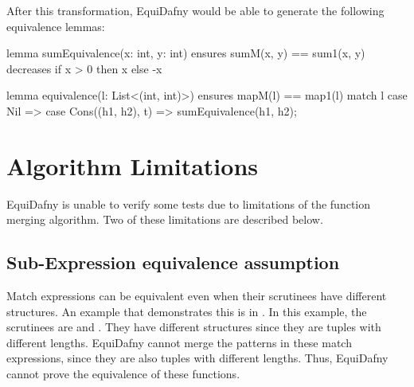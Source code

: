%
After this transformation, EquiDafny would be able to generate the following equivalence lemmas:
\begin{dafny}
lemma sumEquivalence(x: int, y: int)
  ensures sumM(x, y) == sum1(x, y)
  decreases if x > 0 then x else -x
{}

lemma equivalence(l: List<(int, int)>)
  ensures mapM(l) == map1(l)
{
  match l {
    case Nil => {}
    case Cons((h1, h2), t) => sumEquivalence(h1, h2);
  }
}
\end{dafny}
%

\section{Algorithm Limitations}

EquiDafny is unable to verify some tests due to limitations of the function merging algorithm. Two of these limitations are described below.  

\subsection{Sub-Expression equivalence assumption}\label{sec:equiv-assumption}

Match expressions can be equivalent even when their scrutinees have different structures. An example that demonstrates this is in . In this example, the scrutinees are  and . They have different structures since they are tuples with different lengths. EquiDafny cannot merge the patterns in these match expressions, since they are also tuples with different lengths. Thus, EquiDafny cannot prove the equivalence of these functions.

